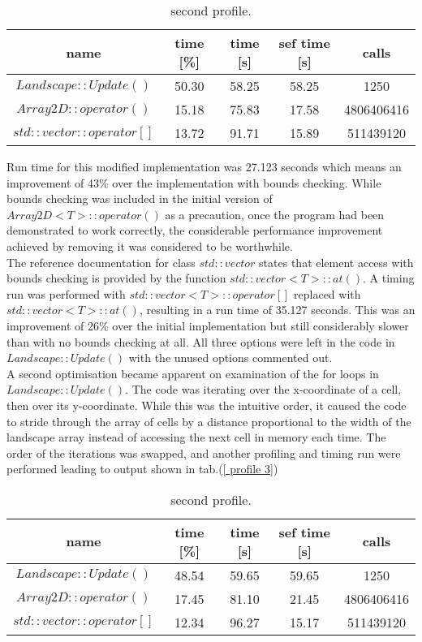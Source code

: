 \begin{table}
\caption{second profile.}
\label{tab: profile 2}
 \begin{center}
\begin{tabular}{|c|c|c|c|c|}
\hline
name & time [\%] & time [s] & sef time [s] & calls\\
\hline
$Landscape::Update()$ & 50.30 & 58.25 & 58.25 & 1250\\
\hline
$Array2D::operator()$& 15.18 & 75.83& 17.58 & 4806406416\\
\hline
$std::vector::operator[]$&13.72& 91.71 &15.89 & 511439120\\
\hline
\end{tabular}
\end{center}
\end{table}

Run time for this modified implementation was 27.123 seconds which means an improvement of 43\% over the implementation with bounds checking.
While bounds checking was included in the initial version of $Array2D<T>::operator()$ as a precaution, once the program had been demonstrated to work correctly, the considerable performance improvement achieved by removing it was considered to be worthwhile.\\
The reference documentation for class $std::vector$ states that element access with bounds checking is provided by the function $std::vector<T>::at()$.  A timing run was performed with $std::vector<T>::operator[]$ replaced with $std::vector<T>::at()$, resulting in a run time of 35.127 seconds.
This was an improvement of 26\% over the initial implementation but still considerably slower than with no bounds checking at all. 
All three options were left in the code in $Landscape::Update()$ with the unused options commented out.\\

A second optimisation became apparent on examination of the for loops in $Landscape::Update()$. The code was iterating over the x-coordinate of a cell, then over its y-coordinate.
While this was the intuitive order, it caused the code to stride through the array of cells by a distance proportional to the width of the landscape array instead of accessing the next cell in memory each time.
The order of the iterations was swapped, and another profiling and timing run were performed leading to output shown in tab.(\ref{ profile 3})


\begin{table}
\caption{second profile.}
\label{tab: profile 3}
 \begin{center}
\begin{tabular}{|c|c|c|c|c|}
\hline
name & time [\%] & time [s] & sef time [s] & calls\\
\hline
$Landscape::Update()$ & 48.54 & 59.65 & 59.65 &1250 \\
\hline
$Array2D::operator()$& 17.45& 81.10& 21.45 &4806406416 \\
\hline
$std::vector::operator[]$& 12.34& 96.27 &15.17 &511439120\\
\hline
\end{tabular}
\end{center}
\end{table}


